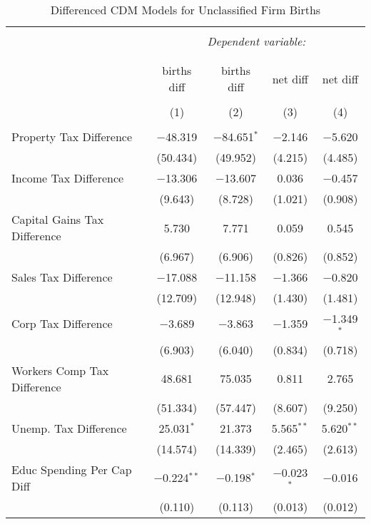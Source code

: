 
\begin{table}[!htbp] \centering 
  \caption{Differenced CDM Models for  Unclassified Firm Births} 
  \label{} 
\begin{tabular}{@{\extracolsep{5pt}}lcccc} 
\\[-1.8ex]\hline 
\hline \\[-1.8ex] 
 & \multicolumn{4}{c}{\textit{Dependent variable:}} \\ 
\cline{2-5} 
\\[-1.8ex] & \multicolumn{4}{c}{ } \\ 
 & births diff & births diff & net diff & net diff \\ 
\\[-1.8ex] & (1) & (2) & (3) & (4)\\ 
\hline \\[-1.8ex] 
 Property Tax Difference & $-$48.319 & $-$84.651$^{*}$ & $-$2.146 & $-$5.620 \\ 
  & (50.434) & (49.952) & (4.215) & (4.485) \\ 
  Income Tax Difference & $-$13.306 & $-$13.607 & 0.036 & $-$0.457 \\ 
  & (9.643) & (8.728) & (1.021) & (0.908) \\ 
  Capital Gains Tax Difference & 5.730 & 7.771 & 0.059 & 0.545 \\ 
  & (6.967) & (6.906) & (0.826) & (0.852) \\ 
  Sales Tax Difference & $-$17.088 & $-$11.158 & $-$1.366 & $-$0.820 \\ 
  & (12.709) & (12.948) & (1.430) & (1.481) \\ 
  Corp Tax Difference & $-$3.689 & $-$3.863 & $-$1.359 & $-$1.349$^{*}$ \\ 
  & (6.903) & (6.040) & (0.834) & (0.718) \\ 
  Workers Comp Tax Difference & 48.681 & 75.035 & 0.811 & 2.765 \\ 
  & (51.334) & (57.447) & (8.607) & (9.250) \\ 
  Unemp. Tax Difference & 25.031$^{*}$ & 21.373 & 5.565$^{**}$ & 5.620$^{**}$ \\ 
  & (14.574) & (14.339) & (2.465) & (2.613) \\ 
  Educ Spending Per Cap Diff & $-$0.224$^{**}$ & $-$0.198$^{*}$ & $-$0.023$^{*}$ & $-$0.016 \\ 
  & (0.110) & (0.113) & (0.013) & (0.012) \\ 

\end{tabular}
\end{table}
